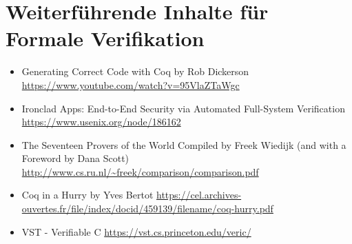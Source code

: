 \section{Weiterführende Inhalte für Formale Verifikation}
\label{a:somelabel}

\begin{itemize}
	\item Generating Correct Code with Coq by Rob Dickerson \url{https://www.youtube.com/watch?v=95VlaZTaWgc}
	\item Ironclad Apps: End-to-End Security via Automated Full-System Verification \url{https://www.usenix.org/node/186162}
	\item The Seventeen Provers of the World Compiled by Freek Wiedijk
	(and with a Foreword by Dana Scott)
	\url{http://www.cs.ru.nl/~freek/comparison/comparison.pdf}
	\item Coq in a Hurry by Yves Bertot \url{https://cel.archives-ouvertes.fr/file/index/docid/459139/filename/coq-hurry.pdf}
	\item VST - Verifiable C \url{https://vst.cs.princeton.edu/veric/}
\end{itemize} 

